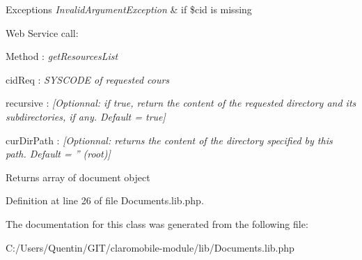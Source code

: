 \begin{DoxyExceptions}{Exceptions}
{\em InvalidArgumentException} & if \$cid is missing \\
\hline
\end{DoxyExceptions}
\begin{DoxyParagraph}{Web Service call:}

\end{DoxyParagraph}

\begin{DoxyPre}        Method : {\itshape getResourcesList\/}\end{DoxyPre}



\begin{DoxyPre}        cidReq : {\itshape SYSCODE of requested cours\/}\end{DoxyPre}



\begin{DoxyPre}        recursive : {\itshape [Optionnal: if true, return the content of the requested directory and its subdirectories, if any. Default = true]\/}\end{DoxyPre}



\begin{DoxyPre}        curDirPath : {\itshape [Optionnal: returns the content of the directory specified by this path. Default = '' (root)]\/}\end{DoxyPre}


\begin{DoxyReturn}{Returns}
array of document object 
\end{DoxyReturn}


Definition at line 26 of file Documents.lib.php.



The documentation for this class was generated from the following file:\begin{DoxyCompactItemize}
\item 
C:/Users/Quentin/GIT/claromobile-\/module/lib/Documents.lib.php\end{DoxyCompactItemize}
